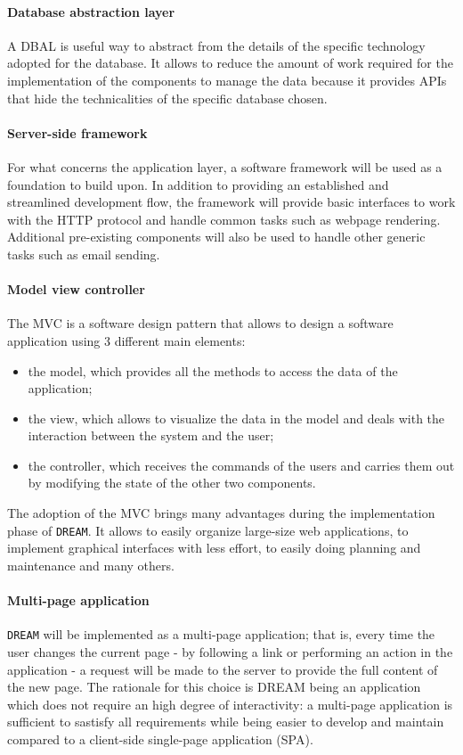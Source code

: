 \documentclass{article}
\begin{document}
\paragraph{Database abstraction layer}
A DBAL is useful way to abstract from the details of the specific technology adopted for the database. It allows to reduce the amount of work required for the implementation of the components to manage the data because it provides APIs that hide the technicalities of the specific database chosen.
\paragraph{Server-side framework}
For what concerns the application layer, a software framework will be used as a foundation to build upon. In addition to providing an established and streamlined development flow, the framework will provide basic interfaces to work with the HTTP protocol and handle common tasks such as webpage rendering. Additional pre-existing components will also be used to handle other generic tasks such as email sending.
\paragraph{Model view controller}
The MVC is a software design pattern that allows to design a software application using 3 different main elements:
\begin{itemize}
    \item the model, which provides all the methods to access the data of the application;
    \item the view, which allows to visualize the data in the model and deals with the interaction between the system and the user;
    \item the controller, which receives the commands of the users and carries them out by modifying the state of the other two components.
\end{itemize}
The adoption of the MVC brings many advantages during the implementation phase of \verb|DREAM|. It allows to easily organize large-size web applications, to implement graphical interfaces with less effort, to easily doing planning and maintenance and many others.
\paragraph{Multi-page application}
\verb|DREAM| will be implemented as a multi-page application; that is, every time the user changes the current page - by following a link or performing an action in the application - a request will be made to the server to provide the full content of the new page. \newline
The rationale for this choice is DREAM being an application which does not require an high degree of interactivity: a multi-page application is sufficient to sastisfy all requirements while being easier to develop and maintain compared to a client-side single-page application (SPA).
\end{document}
